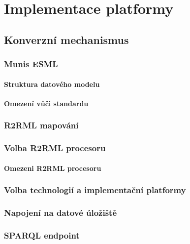\chapter{Implementace platformy}

\section{Konverzní mechanismus}

\subsection{Munis ESML}

\subsubsection{Struktura datového modelu}

\subsubsection{Omezení vůči standardu}

\subsection{R2RML mapování}

\subsection{Volba R2RML procesoru}

\subsubsection{Omezeni R2RML procesoru}

\subsection{Volba technologií a implementační platformy}

\subsection{Napojení na datové úložiště}

\subsection{SPARQL endpoint}

